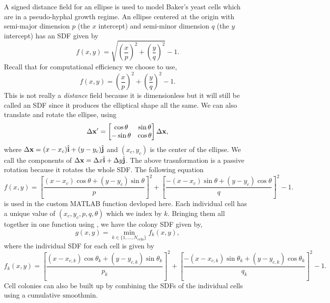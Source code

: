 A signed distance field for an ellipse is used to model Baker's yeast cells which
are in a pseudo-hyphal growth regime.
An ellipse centered at the origin with semi-major dimension $p$ (the $x$ intercept) and
semi-minor dimension $q$ (the $y$ intercept) has an SDF given by
\begin{equation*}
    f(x,y) = \sqrt{ \left( \frac{x}{p} \right)^2 + \left( \frac{y}{q} \right)^2 } - 1.
\end{equation*}
Recall that for computational efficiency we choose to use,
\begin{equation*}
    f(x,y) = \left( \frac{x}{p} \right)^2 + \left( \frac{y}{q} \right)^2  - 1.
\end{equation*}
This is not really a \textit{distance} field because it is 
dimensionless but it will still be called an SDF since it produces the 
elliptical shape all the same. We can also translate and rotate the ellipse, using
\begin{equation*} 
    \Delta \vb{x}' = 
    \begin{bmatrix}
        \cos{\theta} & \sin{\theta} \\
        -\sin{\theta} & \cos{\theta} 
    \end{bmatrix}
    \Delta \vb{x},
\end{equation*}
where $\Delta \vb{x} = (x-x_c) \hat{\vb{i}} + (y-y_c)\hat{\vb{j}} $ and $(x_c,y_c)$ is the
center of the ellipse. We call the components of $\Delta \vb{x} = \Delta x \hat{\vb{i}} +
\Delta y \hat{\vb{j}} $. The above trasnformation is a passive rotation because 
it rotates the whole SDF. The following equation
\begin{equation*}
    f(x,y) = \left[\frac{ (x-x_c)\cos{\theta} + (y-y_c) \sin{\theta}}{p} \right]^2 
        + \left[ \frac{-(x-x_c)\sin{\theta} +(y-y_c) \cos{\theta}}{q} \right]^2 - 1.
\end{equation*}
is used in the custom MATLAB function  devloped here. Each individual 
cell has a unique value of $(x_c,y_c,p,q,\theta)$ which we index by $k$. Bringing them all 
together in one function using , we have the colony SDF given by,
\begin{equation*}
    g(x,y) = \min_{k \in \{1, ..., N_{\textrm{cells}}\}} f_k(x,y),
\end{equation*}
where the individual SDF for each cell is given by 
\begin{equation*}
    f_k(x,y) = \left[\frac{ (x-x_{c,k})\cos{\theta_k} + (y-y_{c,k}) \sin{\theta_k}}{p_k} \right]^2 
        + \left[ \frac{-(x-x_{c,k})\sin{\theta_k} +(y-y_{c,k}) \cos{\theta_k}}{q_k} \right]^2 - 1.
\end{equation*}
Cell colonies can also be built up by combining the SDFs of the individual cells 
using a cumulative $\textrm{smoothmin}$.
\\

